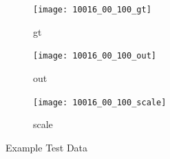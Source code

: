 \documentclass{article}
\begin{document}
\begin{figure}[h!]
  \centering
  \begin{subfigure}[b]{0.3\textwidth}
    \texttt{[image: 10016\_00\_100\_gt]}
    \caption{gt}
  \end{subfigure}
  \begin{subfigure}[b]{0.3\textwidth}
    \texttt{[image: 10016\_00\_100\_out]}
    \caption{out}
  \end{subfigure}
  \begin{subfigure}[b]{0.3\textwidth}
    \texttt{[image: 10016\_00\_100\_scale]}
    \caption{scale}
  \end{subfigure}
  \caption{\label{test} Example Test Data}
\end{figure}



\end{document}
